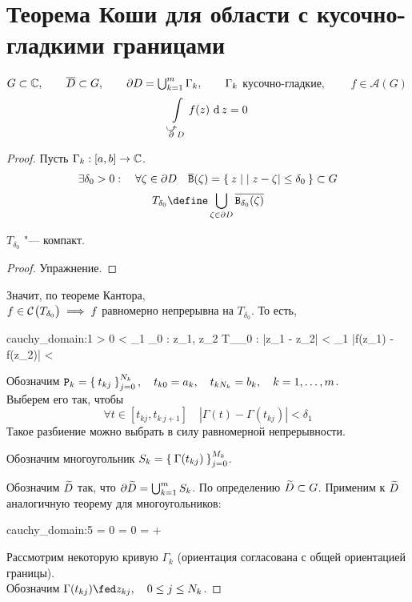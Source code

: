 
\section{Теорема Коши для области с кусочно-гладкими границами}

\begin{theorem}
	$ G \sub \Co, \qquad \ol D \sub G, \qquad \partial D = \bigcup_{k = 1}^m \Gamma_k, \qquad \Gamma_k $ кусочно-гладкие, $ \qquad f \in \mathcal A(G) $
	$$ \cint[z]{\curvedir\partial D}{f(z)} = 0 $$
\end{theorem}

\begin{proof}
	Пусть $ \Gamma_k : [a, b] \to \Co $.
	$$ \exists \delta_0 > 0 : \quad \forall \zeta \in \partial D \quad \ol{\mathtt B}(\zeta) = \set{ z \mid |z - \zeta| \le \delta_0} \sub G $$
	$$ T_{\delta_0} \define \bigcup_{\zeta \in \partial D} \ol{\mathtt B_{\delta_0}(\zeta)} $$
	\begin{statement}
		$ T_{\delta_0} $ "--- компакт.
	\end{statement}
	\begin{proof}
		Упражнение.
	\end{proof}
	Значит, по теореме Кантора, \\
	$ f \in \Cont{T_{\delta_0}} \implies f $ равномерно непрерывна на $ T_{\delta_0} $. То есть,
	\begin{equ}{cauchy_domain:1}
		\forall \eps > 0 \quad {} < \delta_1 \le \delta_0 : \quad \forall z_1, z_2 \in T_{\delta_0} : |z_1 - z_2| < \delta_1 \quad |f(z_1) - f(z_2)| < \eps
	\end{equ}
	Обозначим $ \mathtt P_k = \seqz[N_k]{t_{kj}}j, \quad t_{k0} = a_k, \quad t_{kN_k} = b_k, \quad k = 1, \dots, m $. \\
	Выберем его так, чтобы
	$$ \forall t \in [t_{kj}, t_{k~j + 1}] \quad |\Gamma(t) - \Gamma(t_{kj})| < \delta_1 $$
	Такое разбиение можно выбрать в силу равномерной непрерывности.

	Обозначим многоугольник $ S_k = \seqz[M_k]{\Gamma(t_{kj})}j $.

	Обозначим $ \vawe D $ так, что $ \partial \vawe D = \bigcup_{k = 1}^m S_k $. По определению $ \vawe D \sub G $. Применим к $ \vawe D $ аналогичную теорему для многоугольников:
	\begin{equ}{cauchy_domain:5}
		 = 0 \quad
		\implies \quad {} = 0 \quad
		\implies \quad {} =  + 
	\end{equ}
	Рассмотрим некоторую кривую $ \Gamma_k $ (ориентация согласована с общей ориентацией границы). \\
	Обозначим $ \Gamma(t_{kj}) \fed z_{kj}, \quad 0 \le j \le N_k $.


\end{proof}
